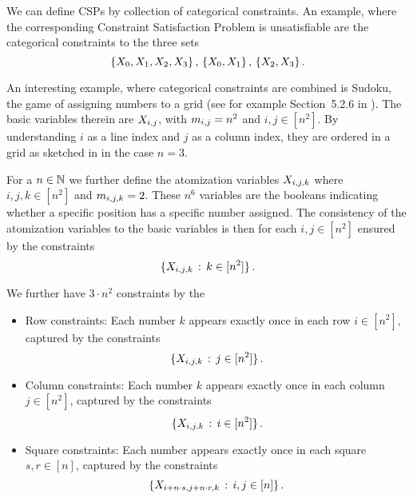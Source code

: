 \begin{remark}
	We can define CSPs by collection of categorical constraints.
	An example, where the corresponding Constraint Satisfaction Problem is unsatisfiable are the categorical constraints to the three sets
		\[ \{X_{0},X_{1},X_{2},X_{3}\} \, , \, \{X_{0},X_{1}\}\, ,\,\{X_{2},X_{3}\} \, . \]
\end{remark}


\begin{example}[Sudoku]\label{exa:sudoku}
	An interesting example, where categorical constraints are combined is Sudoku, the game of assigning numbers to a grid (see for example Section~5.2.6 in \cite{russell_artificial_2021}).
	The basic variables therein are $X_{i,j}$, with $m_{i,j}=n^2$ and $i,j\in[n^2]$.
	By understanding $i$ as a line index and $j$ as a column index, they are ordered in a grid as sketched in  in the case $n=3$.

	For a $n\in\mathbb{N}$ we further define the atomization variables $X_{i,j,k}$ where $i,j,k\in[n^2]$ and $m_{i,j,k}=2$.
	These $n^6$ variables are the booleans indicating whether a specific position has a specific number assigned.
	The consistency of the atomization variables to the basic variables is then for each $i,j\in[n^2]$ ensured by the constraints
		\[ \{X_{i,j,k} \, : \, k\in [n^2] \} \, . \]

	We further have $3\cdot n^2$ constraints by the
	\begin{itemize}
		\item Row constraints: Each number $k$ appears exactly once in each row $i\in[n^2]$, captured by the constraints
			\[ \{X_{i,j,k}  \, : \, j \in [n^2] \} \, . \]
		\item Column constraints: Each number $k$ appears exactly once in each column $j\in[n^2]$, captured by the constraints
			\[ \{X_{i,j,k}  \, : \, i \in [n^2] \} \, . \]
		\item Square constraints: Each number appears exactly once in each square $s,r\in[n]$, captured by the constraints
			\[ \{X_{i+n\cdot s,j+n\cdot r,k}  \, : \, i,j \in [n] \} \, . \]
	\end{itemize}


\end{example}
